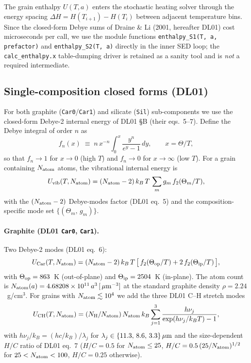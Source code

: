 \documentclass{my_memo}
\newcommand{\umass}{\ensuremath{\,\mu{\rm m}}}
\begin{document}
The grain enthalpy $U(T, a)$ enters the stochastic heating solver
through the energy spacing $\Delta H = H(T_{i+1}) - H(T_i)$ between
adjacent temperature bins. Since the closed-form Debye sums of
Draine \& Li (2001, hereafter DL01) cost microseconds per call, we use
the module functions
\texttt{enthalpy\_S1(T, a, prefactor)} and
\texttt{enthalpy\_S2(T, a)} directly in the inner SED loop; the
\texttt{calc\_enthalpy.x} table-dumping driver is retained as a sanity
tool and is \emph{not} a required intermediate.

\subsection{Single-composition closed forms (DL01)}

For both graphite (\texttt{Car0}/\texttt{Car1}) and silicate
(\texttt{Sil}) sub-components we use the closed-form Debye-2 internal
energy of DL01 \S B (their eqs.\ 5--7). Define the Debye integral of
order $n$ as
\begin{equation}
f_n(x) \;\equiv\; n\,x^{-n}\!\int_0^{x}\frac{y^{n}}{e^{y}-1}\,dy,
\qquad x = \Theta/T,
\end{equation}
so that $f_n \to 1$ for $x\to 0$ (high $T$) and $f_n \to 0$ for
$x\to\infty$ (low $T$). For a grain containing $N_{\rm atom}$ atoms,
the vibrational internal energy is
\begin{equation}\label{eq:U_DL01}
U_{\text{vib}}(T, N_{\rm atom}) = (N_{\rm atom} - 2)\,k_B\,T\,
   \sum_{m} g_m\,f_2(\Theta_m / T),
\end{equation}
with the $(N_{\rm atom}-2)$ Debye-modes factor (DL01 eq.\ 5) and the
composition-specific mode set $\{(\Theta_m,\,g_m)\}$.

\paragraph{Graphite (DL01 \texttt{Car0}, \texttt{Car1}).}
Two Debye-2 modes (DL01 eq.\ 6):
\begin{equation}
U_{\rm Car}(T, N_{\rm atom}) = (N_{\rm atom}-2)\,k_B\,T\,
   \bigl[\,f_2(\Theta_{\rm op}/T) + 2\,f_2(\Theta_{\rm ip}/T)\,\bigr],
\end{equation}
with $\Theta_{\rm op} = 863$~K (out-of-plane) and
$\Theta_{\rm ip} = 2504$~K (in-plane). The atom count is
$N_{\rm atom}(a) = 4.68208\times10^{11}\,a^{3}\,[\umass^{-3}]$ at the
standard graphite density $\rho = 2.24$~g/cm$^3$. For grains with
$N_{\rm atom} \lesssim 10^{4}$ we add the three DL01 C--H stretch
modes
\begin{equation}
U_{\rm CH}(T, N_{\rm atom}) = (N_{\rm H}/N_{\rm atom})\,N_{\rm atom}\,k_B
   \sum_{j=1}^{3}\frac{h\nu_j}{\exp(h\nu_j/k_BT) - 1},
\end{equation}
with $h\nu_j/k_B = (hc/k_B)/\lambda_j$ for
$\lambda_j \in \{11.3,\,8.6,\,3.3\}\umass$ and the size-dependent
$H/C$ ratio of DL01 eq.\ 7
($H/C = 0.5$ for $N_{\rm atom}\le 25$,
$H/C = 0.5\,(25/N_{\rm atom})^{1/2}$ for $25 < N_{\rm atom} < 100$,
$H/C = 0.25$ otherwise).
\end{document}
